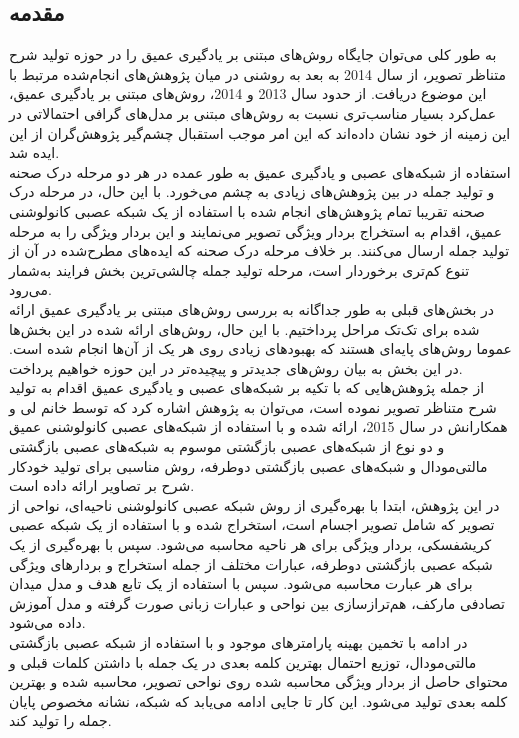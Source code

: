 \subsection{مقدمه}

به طور کلی می‌توان جایگاه روش‌های مبتنی بر یادگیری عمیق را در حوزه تولید شرح متناظر تصویر، از سال 2014 به بعد به روشنی در میان پژوهش‌های انجام‌شده مرتبط با این موضوع دریافت. از حدود سال 2013 و 2014، روش‌های مبتنی بر یادگیری عمیق، عمل‌کرد بسیار مناسب‌تری نسبت به روش‌های مبتنی بر مدل‌های گرافی احتمالاتی در این زمینه از خود نشان داده‌اند که این امر موجب استقبال چشم‌گیر پژوهش‌گران از این ایده شد.
\\
 استفاده از شبکه‌های عصبی و یادگیری عمیق به طور عمده در هر دو مرحله درک صحنه و تولید جمله در بین پژوهش‌های زیادی به چشم می‌خورد. با این حال، در مرحله درک صحنه تقریبا تمام پژوهش‌های انجام شده با استفاده از یک شبکه عصبی کانولوشنی عمیق، اقدام به استخراج بردار ویژگی تصویر می‌نمایند و این بردار ویژگی را به مرحله تولید جمله ارسال می‌کنند. بر خلاف مرحله درک صحنه که ایده‌های مطرح‌شده در آن از تنوع کم‌تری برخوردار است، مرحله تولید جمله چالشی‌ترین بخش فرایند به‌شمار می‌رود. 
 \\
 در بخش‌های قبلی به طور جداگانه به بررسی روش‌های مبتنی بر یادگیری عمیق ارائه شده برای تک‌تک مراحل  پرداختیم. با این حال، روش‌های ارائه شده در این بخش‌ها عموما روش‌های پایه‌ای هستند که بهبودهای زیادی روی هر یک از آن‌ها انجام شده است. در این بخش به بیان روش‌های جدیدتر و پیچیده‌تر در این حوزه خواهیم پرداخت.
 \\
از جمله پژوهش‌هایی که با تکیه بر شبکه‌های عصبی و یادگیری عمیق اقدام به تولید شرح متناظر تصویر نموده است، می‌توان به پژوهش \cite{karpathy2015deep} اشاره کرد که توسط خانم لی و همکارانش در سال 2015، ارائه شده و با استفاده از شبکه‌های عصبی کانولوشنی عمیق و دو نوع از شبکه‌های عصبی بازگشتی موسوم به شبکه‌های عصبی بازگشتی مالتی‌مودال و شبکه‌های عصبی بازگشتی دوطرفه، روش مناسبی برای تولید خودکار شرح بر تصاویر ارائه داده است.
\\
در این پژوهش، ابتدا با بهره‌گیری از روش شبکه عصبی کانولوشنی ناحیه‌ای، نواحی از تصویر که شامل تصویر اجسام است، استخراج شده و با استفاده از یک شبکه عصبی کریشفسکی، بردار ویژگی برای هر ناحیه محاسبه می‌شود. سپس با بهره‌گیری از یک شبکه عصبی بازگشتی دوطرفه، عبارات مختلف از جمله استخراج و بردارهای ویژگی برای هر عبارت محاسبه می‌شود. سپس با استفاده از یک تابع هدف و مدل میدان تصادفی مارکف، هم‌ترازسازی بین نواحی و عبارات زبانی صورت گرفته و مدل آموزش داده می‌شود.
\\
 در ادامه با تخمین بهینه پارامترهای موجود و با استفاده از شبکه عصبی بازگشتی مالتی‌مودال، توزیع احتمال بهترین کلمه بعدی در یک جمله با داشتن کلمات قبلی و محتوای حاصل از بردار ویژگی محاسبه شده روی نواحی تصویر، محاسبه شده و بهترین کلمه بعدی تولید می‌شود. این کار تا جایی ادامه می‌یابد که شبکه، نشانه مخصوص پایان جمله را تولید کند.
  
